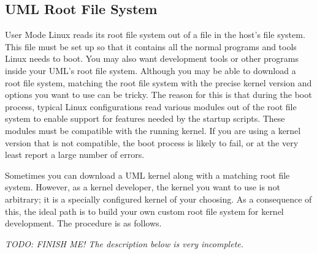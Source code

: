 \documentclass{article}
\newcommand{\todo}[1]{\textit{TODO: #1}}
\begin{document}
\subsection{UML Root File System}

User Mode Linux reads its root file system out of a file in the host's file system. This file
must be set up so that it contains all the normal programs and tools Linux needs to boot. You
may also want development tools or other programs inside your UML's root file system. Although
you may be able to download a root file system, matching the root file system with the precise
kernel version and options you want to use can be tricky. The reason for this is that during the
boot process, typical Linux configurations read various modules out of the root file system to
enable support for features needed by the startup scripts. These modules must be compatible with
the running kernel. If you are using a kernel version that is not compatible, the boot process
is likely to fail, or at the very least report a large number of errors.

Sometimes you can download a UML kernel along with a matching root file system. However, as a
kernel developer, the kernel you want to use is not arbitrary; it is a specially configured
kernel of your choosing. As a consequence of this, the ideal path is to build your own custom
root file system for kernel development. The procedure is as follows.

\todo{FINISH ME! The description below is very incomplete.}
\end{document}

